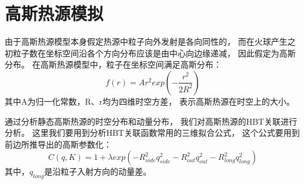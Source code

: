 \section{高斯热源模拟}
由于高斯热源模型本身假定热源中粒子向外发射是各向同性的，%
而在火球产生之初粒子数在坐标空间沿各个方向分布应该是由中心向边缘递减，%
因此假定为高斯分布。%
在高斯热源模型中，粒子在坐标空间满足高斯分布：%
\begin{equation}
  \label{eq:chapterSix8}
  f(r) = Ar^{2}exp(-\frac{r^{2}}{2R^{2}})
\end{equation}
其中A为归一化常数，R、r均为四维时空方差，%
表示高斯热源在时空上的大小。
\par
通过分析静态高斯热源的时空分布和动量分布，%
我们对高斯热源的HBT关联进行分析。%
这里我们要用到分析HBT关联函数常用的三维拟合公式，%
这个公式要用到前边所推导出的高斯参数化：
\begin{equation}
  \label{eq:chapterSix9}
  C(q, K) = 1 + \lambda exp(-R_{side}^{2}q_{side}^{2} - R_{out}^{2}q_{out}^{2} - R_{long}^{2}q_{long}^{2})
\end{equation}
其中，$q_{long}$是沿粒子入射方向的动量差。

